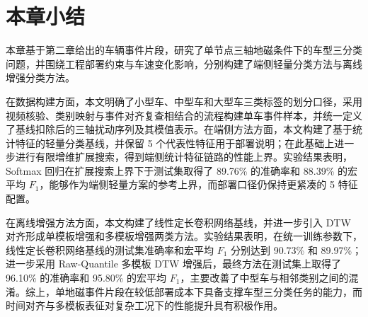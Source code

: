 \section{本章小结}
\label{sec:ch3_summary}

本章基于第二章给出的车辆事件片段，研究了单节点三轴地磁条件下的车型三分类问题，并围绕工程部署约束与车速变化影响，分别构建了端侧轻量分类方法与离线增强分类方法。

在数据构建方面，本文明确了小型车、中型车和大型车三类标签的划分口径，采用视频核验、类别映射与事件对齐复查相结合的流程构建单车事件样本，并统一定义了基线扣除后的三轴扰动序列及其模值表示。在端侧方法方面，本文构建了基于统计特征的轻量分类基线，并保留 5 个代表性特征用于部署说明；在此基础上进一步进行有限增维扩展搜索，得到端侧统计特征链路的性能上界。实验结果表明，Softmax 回归在扩展搜索上界下于测试集取得了 89.76\% 的准确率和 88.39\% 的宏平均 $F_1$，能够作为端侧轻量方案的参考上界，而部署口径仍保持更紧凑的 5 特征配置。

在离线增强方法方面，本文构建了线性定长卷积网络基线，并进一步引入 DTW 对齐形成单模板增强和多模板增强两类方法。实验结果表明，在统一训练参数下，线性定长卷积网络基线的测试集准确率和宏平均 $F_1$ 分别达到 90.73\% 和 89.97\%；进一步采用 Raw-Quantile 多模板 DTW 增强后，最终方法在测试集上取得了 96.10\% 的准确率和 95.80\% 的宏平均 $F_1$，主要改善了中型车与相邻类别之间的混淆。综上，单地磁事件片段在较低部署成本下具备支撑车型三分类任务的能力，而时间对齐与多模板表征对复杂工况下的性能提升具有积极作用。




